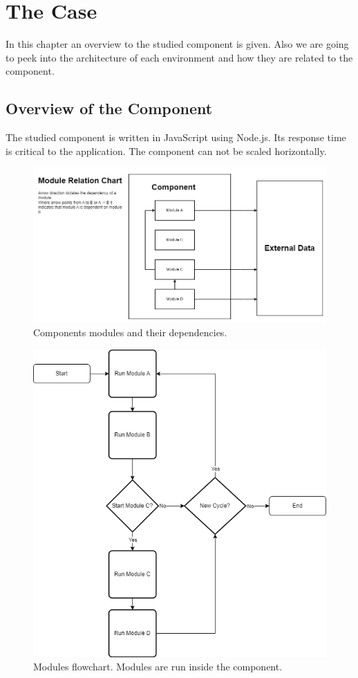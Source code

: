 \chapter{The Case\label{case}}
In this chapter an overview to the studied component is given.
Also we are going to peek into the architecture of each environment and how they are related to the component.

\section{Overview of the Component}
The studied component is written in JavaScript using Node.js.
Its response time is critical to the application.
The component can not be scaled horizontally.

\begin{figure}
    \includegraphics[width=\textwidth]{images/modules_relation_uml.png}
    \caption{Components modules and their dependencies.}
    \label{figure:module:relation}
\end{figure}
\begin{figure}
    \includegraphics[width=\textwidth]{images/module_flow_chart.png}
    \caption{Modules flowchart. Modules are run inside the component.}
    \label{figure:module:flow}
\end{figure}

